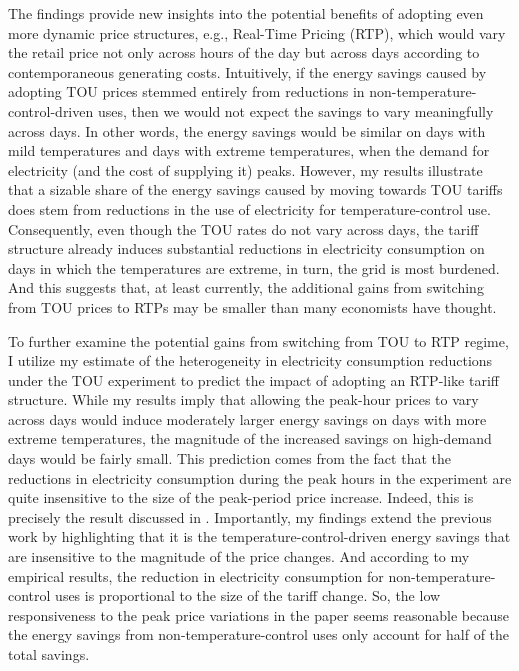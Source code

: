 The findings provide new insights into the potential benefits of adopting even more dynamic price structures, e.g., Real-Time Pricing (RTP), which would vary the retail price not only across hours of the day but across days according to contemporaneous generating costs. Intuitively, if the energy savings caused by adopting TOU prices stemmed entirely from reductions in non-temperature-control-driven uses, then we would not expect the savings to vary meaningfully across days. In other words, the energy savings would be similar on days with mild temperatures and days with extreme temperatures, when the demand for electricity (and the cost of supplying it) peaks. However, my results illustrate that a sizable share of the energy savings caused by moving towards TOU tariffs does stem from reductions in the use of electricity for temperature-control use. Consequently, even though the TOU rates do not vary across days, the tariff structure already induces substantial reductions in electricity consumption on days in which the temperatures are extreme, in turn, the grid is most burdened. And this suggests that, at least currently, the additional gains from switching from TOU prices to RTPs may be smaller than many economists have thought. 

To further examine the potential gains from switching from TOU to RTP regime, I utilize my estimate of the heterogeneity in electricity consumption reductions under the TOU experiment to predict the impact of adopting an RTP-like tariff structure. While my results imply that allowing the peak-hour prices to vary across days would induce moderately larger energy savings on days with more extreme temperatures, the magnitude of the increased savings on high-demand days would be fairly small. This prediction comes from the fact that the reductions in electricity consumption during the peak hours in the experiment are quite insensitive to the size of the peak-period price increase. Indeed, this is precisely the result discussed in \cite{Peaking-Interest:How-Awareness-Drives-the-Effectiveness-of-Time-of-Use-Electricity-Pricing}. Importantly, my findings extend the previous work by highlighting that it is the temperature-control-driven energy savings that are insensitive to the magnitude of the price changes. And according to my empirical results, the reduction in electricity consumption for non-temperature-control uses is proportional to the size of the tariff change. So, the low responsiveness to the peak price variations in the paper seems reasonable because the energy savings from non-temperature-control uses only account for half of the total savings.

